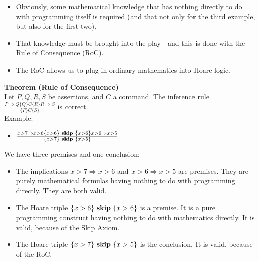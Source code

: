 \begin{multicols}{2}
\begin{itemize}
  \item Obviously, some mathematical knowledge that has nothing directly to do with programming itself is required (and that not only for the third example, but also for the first two).
  \item That knowledge must be brought into the play - and this is done with the Rule of Consequence (RoC).
  \item The RoC allows us to plug in ordinary mathematics into Hoare logic.
\end{itemize}
\textbf{Theorem (Rule of Consequence)}\\
Let $P,Q,R,S$ be assertions, and $C$ a command. The inference rule $\frac{P \Rightarrow Q \{Q\}C\{R\} R \Rightarrow S}{\{P\}C\{S\}}$ is correct.\\
Example:
\begin{itemize}
  \item [\-] $\frac{x>7 \Rightarrow x>6 \{x>6\} \text{ \textbf{skip} } \{x>6\} x>6 \Rightarrow x>5}{\{x>7\} \text{ \textbf{skip} } \{x>5\}}$
\end{itemize}
We have three premises and one conclusion:
\begin{itemize}
  \item The implications $x>7 \Rightarrow x>6$ and $x>6 \Rightarrow x>5$ are premises. They are purely mathematical formulas having nothing to do with programming directly. They are both valid.
  \item The Hoare triple $\{x>6\} \text{ \textbf{skip} } \{x>6\}$ is a premise. It is a pure programming construct having nothing to do with mathematics directly. It is valid, because of the Skip Axiom.
  \item The Hoare triple $\{x>7\} \text{ \textbf{skip} } \{x>5\}$ is the conclusion. It is valid, because of the RoC.
\end{itemize}


\end{multicols}
